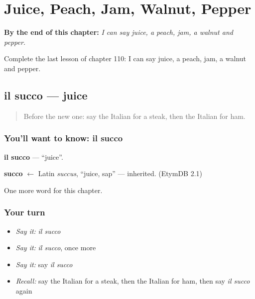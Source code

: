 
\chapter{Juice, Peach, Jam, Walnut, Pepper}
\label{ch:it-juice-peach-jam-walnut-pepper}

\begin{chapteropening}
\textbf{By the end of this chapter:} \emph{I can say juice, a peach, jam, a walnut and pepper.}

Complete the last lesson of chapter 110: I can say juice, a peach, jam, a walnut and pepper.
\end{chapteropening}

\section[il succo]{il succo — juice}

\label{lesson:IT-C110-succo}



\begin{quote}
Before the new one: say the Italian for a steak, then the Italian for ham.
\end{quote}

\subsection*{You'll want to know: il succo}
\textbf{il succo} — \textquotedblleft{}juice\textquotedblright{}.

\begin{cousinweb}
\textbf{succo} $\leftarrow$ Latin \emph{succus}, \textquotedblleft{}juice, sap\textquotedblright{} — inherited. (EtymDB 2.1)
\end{cousinweb}

\begin{grammarlens}[title={What you've built}]
One more word for this chapter.
\end{grammarlens}

\subsection*{Your turn}
\begin{itemize}
\raggedright
  \item \emph{Say it:} \emph{il succo}
  \item \emph{Say it:} \emph{il succo}, once more
  \item \emph{Say it:} say \emph{il succo}
  \item \emph{Recall:} say the Italian for a steak, then the Italian for ham, then say \emph{il succo} again
\end{itemize}

